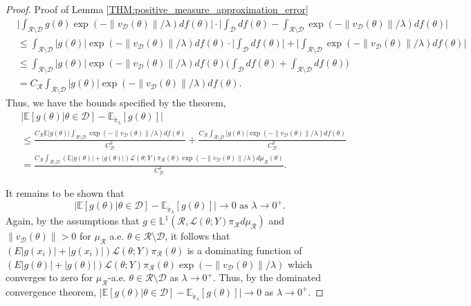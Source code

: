\documentclass[10pt,fleqn]{article} \pdfoutput=1
\newcommand{\bb}[1]{\mathbb{#1}} \newcommand{\mc}[1]{\mathcal{#1}}
\DeclareMathOperator{\1}{\mathbbm{1}} \DeclareMathOperator{\bigO}{\mc O}
\begin{document}
\begin{proof}{Proof of Lemma \ref{THM:positive_measure_approximation_error}}
\begin{align*}
&\bigg| \int_{\mathcal{R}\setminus \mathcal{D}} g(\theta) \exp(-\|v_{\mc D}(\theta)\|/\lambda )df(\theta) \bigg| \cdot \bigg|\int_\mathcal{D} df(\theta) - \int_{\mathcal{R}\setminus \mathcal{D}} \exp(-\|v_{\mc D}(\theta)\|/\lambda ) df(\theta)  \bigg| \\
& \le \int_{\mathcal{R}\setminus \mathcal{D}} |g(\theta)| \exp(-\|v_{\mc D}(\theta)\|/\lambda ) df(\theta)  \cdot \bigg|\int_\mathcal{D} df(\theta) \bigg| + \bigg| \int_{\mathcal{R}\setminus \mathcal{D}}  \exp(-\|v_{\mc D}(\theta)\|/\lambda ) df(\theta) \bigg| \\
&\le  \int_{\mathcal{R}\setminus \mathcal{D}} |g(\theta)| \exp(-\|v_{\mc D}(\theta)\|/\lambda ) df(\theta) \bigg(\int_\mathcal{D} df(\theta) +  \int_{\mathcal{R}\setminus \mathcal{D}}  df(\theta)\bigg)  \\
& = C_\mathcal{R}\int_{\mathcal{R}\setminus \mathcal{D}} |g(\theta)| \exp(-\|v_{\mc D}(\theta)\|/\lambda ) df(\theta).
\end{align*}
Thus, we have the bounds specified by the theorem,
\begin{align*}
&\big| \bb E[g(\theta)|\theta\in\mathcal{D}]-\bb E_{\tilde{\pi}_\lambda}[g(\theta)]\big| \\
& \le \frac{C_\mathcal{R}\bb E|g(\theta)| \int_{\mathcal{R}\setminus \mathcal{D}}\exp(-\|v_{\mc D}(\theta)\|/\lambda ) df(\theta)}{C_\mathcal{D}^2 } + \frac{C_\mathcal{R}\int_{\mathcal{R}\setminus \mathcal{D}} |g(\theta)|\exp(-\|v_{\mc D}(\theta)\|/\lambda ) df(\theta)}{C_\mathcal{D}^2 } \\
&= \frac{C_\mathcal{R}\int_{\mathcal{R}\setminus \mathcal{D}} (\bb E|g(\theta)|+|g(\theta)|) \mathcal{L}(\theta;Y)\pi_\mathcal{R}(\theta)\exp(-\|v_{\mc D}(\theta)\|/\lambda ) d\mu_\mathcal{R}(\theta)}{C_\mathcal{D}^2 }.
\end{align*}

It remains to be shown that $$\big| \bb E[g(\theta)|\theta\in\mathcal{D}]-\bb E_{\tilde{\pi}_\lambda}[g(\theta)]\big| \to 0 \text{ as }\lambda\to0^+.$$
Again, by the assumptions that $g\in\mathbb{L}^1(\mathcal{R},\mathcal{L}(\theta;Y)\pi_\mathcal{R}d\mu_\mathcal{R})$ and $\|v_{\mc D}(\theta)\| >0$ for $\mu_\mathcal{R}$ a.e.  $\theta \in \mathcal{R}\setminus \mathcal{D}$, it follows that $( E|g(x_i)|+|g(x_i)|) \mathcal{L}(\theta;Y)\pi_\mathcal{R}(\theta)$ is a dominating function of $( E|g(\theta)|+|g(\theta)|) \mathcal{L}(\theta;Y)\pi_\mathcal{R}(\theta)\exp(-\|v_{\mc D}(\theta)\|/\lambda )$ which converges to zero for $\mu_\mathcal{R}$-a.e. $\theta\in\mathcal{R}\setminus\mathcal{D}$ as $\lambda\to 0^+.$ Thus, by the dominated convergence theorem, $\big| \bb E[g(\theta)|\theta\in\mathcal{D}]-\bb E_{\tilde{\pi}_\lambda}[g(\theta)]\big|\to 0$ as $\lambda\to0^+.$

\end{proof}
\end{document}
